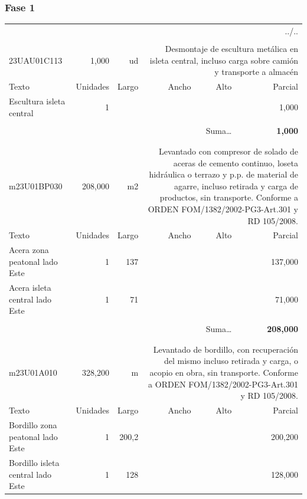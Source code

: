 \documentclass{book}%
\begin{document}
\subsubsection{Fase 1}%
\begin{longtable}{lrrrrr}%
\multicolumn{6}{r}{../..}\\%
\endfoot%
\endlastfoot%
&&&&&\\%
23UAU01C113&     1,000& ud&\multicolumn{3}{p{6cm}}{\scriptsize Desmontaje de escultura metálica en isleta central, incluso carga sobre camión y transporte a almacén\normalsize}\\%
Texto&Unidades&Largo&Ancho&Alto&Parcial\\%
\hline%
\multicolumn{1}{p{3.5cm}}{Escultura isleta central }&1&&&&     1,000\\%
&&&&&\\%
\multicolumn{5}{r}{Suma\ldots}&\textbf{     1,000}\\%
\hline%
&&&&&\\%
&&&&&\\%
m23U01BP030&   208,000& m2&\multicolumn{3}{p{6cm}}{\scriptsize Levantado con compresor de solado de aceras de cemento continuo, loseta hidráulica o terrazo y p.p. de material de agarre, incluso retirada y carga de productos, sin transporte. Conforme a ORDEN FOM/1382/2002-PG3-Art.301 y RD 105/2008.\normalsize}\\%
Texto&Unidades&Largo&Ancho&Alto&Parcial\\%
\hline%
\multicolumn{1}{p{3.5cm}}{Acera  zona peatonal lado Este}&1&137&&&   137,000\\%
\multicolumn{1}{p{3.5cm}}{Acera  isleta central lado Este}&1&71&&&    71,000\\%
&&&&&\\%
\multicolumn{5}{r}{Suma\ldots}&\textbf{   208,000}\\%
\hline%
&&&&&\\%
&&&&&\\%
m23U01A010&   328,200& m&\multicolumn{3}{p{6cm}}{\scriptsize Levantado de bordillo, con recuperación del mismo incluso retirada y carga, o acopio en obra, sin transporte. Conforme a ORDEN FOM/1382/2002-PG3-Art.301 y RD 105/2008.\normalsize}\\%
Texto&Unidades&Largo&Ancho&Alto&Parcial\\%
\hline%
\multicolumn{1}{p{3.5cm}}{Bordillo  zona peatonal lado Este}&1&200,2&&&   200,200\\%
\multicolumn{1}{p{3.5cm}}{Bordillo  isleta central lado Este}&1&128&&&   128,000\\%

\end{longtable}
\end{document}
